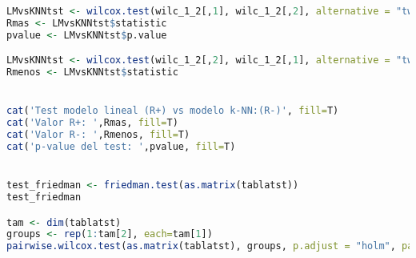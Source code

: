 \begin{lstlisting}[language=R]
LMvsKNNtst <- wilcox.test(wilc_1_2[,1], wilc_1_2[,2], alternative = "two.sided", paired=TRUE)
Rmas <- LMvsKNNtst$statistic
pvalue <- LMvsKNNtst$p.value

LMvsKNNtst <- wilcox.test(wilc_1_2[,2], wilc_1_2[,1], alternative = "two.sided", paired=TRUE)
Rmenos <- LMvsKNNtst$statistic


cat('Test modelo lineal (R+) vs modelo k-NN:(R-)', fill=T)
cat('Valor R+: ',Rmas, fill=T)
cat('Valor R-: ',Rmenos, fill=T)
cat('p-value del test: ',pvalue, fill=T)


test_friedman <- friedman.test(as.matrix(tablatst))
test_friedman

tam <- dim(tablatst)
groups <- rep(1:tam[2], each=tam[1])
pairwise.wilcox.test(as.matrix(tablatst), groups, p.adjust = "holm", paired = TRUE)
\end{lstlisting}